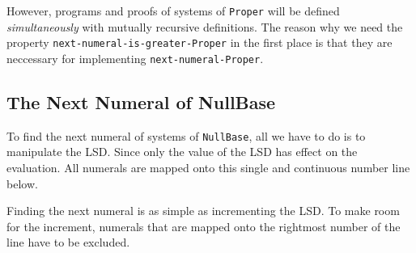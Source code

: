 \documentclass[\main/thesis.tex]{subfiles}
\begin{document}
However, programs and proofs of systems of {\lstinline|Proper|} will be defined
\textit{simultaneously} with mutually recursive definitions.
The reason why we need the property {\lstinline|next-numeral-is-greater-Proper|}
in the first place is that they are neccessary for implementing
{\lstinline|next-numeral-Proper|}.

\subsection{The Next Numeral of NullBase}

To find the next numeral of systems of {\lstinline|NullBase|},
all we have to do is to manipulate the LSD.
Since only the value of the LSD has effect on the evaluation.
All numerals are mapped onto this single and continuous number line below.

\begin{center}
    \begin{adjustbox}{max width=\textwidth}
    \end{adjustbox}
\end{center}

Finding the next numeral is as simple as incrementing the LSD.
To make room for the increment, numerals that are mapped onto the rightmost
number of the line have to be excluded.
\end{document}
